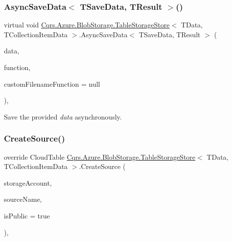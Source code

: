 \subsubsection{\texorpdfstring{Async\+Save\+Data$<$ T\+Save\+Data, T\+Result $>$()}{AsyncSaveData< TSaveData, TResult >()}}
{\footnotesize\ttfamily virtual void \hyperlink{classCqrs_1_1Azure_1_1BlobStorage_1_1TableStorageStore}{Cqrs.\+Azure.\+Blob\+Storage.\+Table\+Storage\+Store}$<$ T\+Data, T\+Collection\+Item\+Data $>$.Async\+Save\+Data$<$ T\+Save\+Data, T\+Result $>$ (\begin{DoxyParamCaption}\item[{T\+Save\+Data}]{data,  }\item[{Func$<$ T\+Save\+Data, Cloud\+Table, T\+Result $>$}]{function,  }\item[{Func$<$ T\+Save\+Data, string $>$}]{custom\+Filename\+Function = {\ttfamily null} }\end{DoxyParamCaption})\hspace{0.3cm}{\ttfamily [protected]}, {\ttfamily [virtual]}}



Save the provided {\itshape data}  asynchronously. 

\mbox{\label{classCqrs_1_1Azure_1_1BlobStorage_1_1TableStorageStore_ad504317a3b2c07172f50b8e7b8d0f78e_ad504317a3b2c07172f50b8e7b8d0f78e}} 
\subsubsection{\texorpdfstring{Create\+Source()}{CreateSource()}}
{\footnotesize\ttfamily override Cloud\+Table \hyperlink{classCqrs_1_1Azure_1_1BlobStorage_1_1TableStorageStore}{Cqrs.\+Azure.\+Blob\+Storage.\+Table\+Storage\+Store}$<$ T\+Data, T\+Collection\+Item\+Data $>$.Create\+Source (\begin{DoxyParamCaption}\item[{Cloud\+Storage\+Account}]{storage\+Account,  }\item[{string}]{source\+Name,  }\item[{bool}]{is\+Public = {\ttfamily true} }\end{DoxyParamCaption})\hspace{0.3cm}{\ttfamily [protected]}, {\ttfamily [virtual]}}



